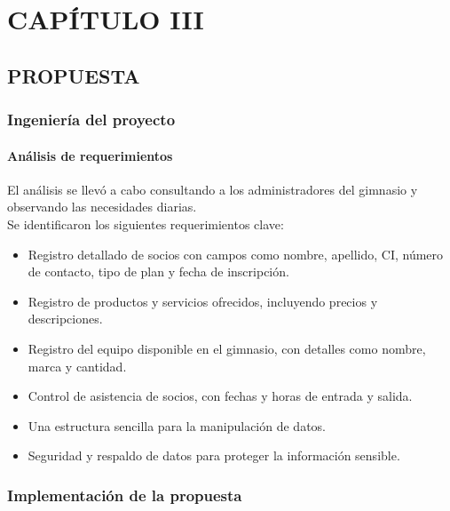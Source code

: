 \documentclass[12pt, letterpaper]{article}
\begin{document}
\section*{CAPÍTULO III}
\setcounter{section}{3}
\subsection{PROPUESTA}
\subsubsection{Ingeniería del proyecto}
\paragraph{Análisis de requerimientos}
El análisis se llevó a cabo consultando a los administradores del gimnasio y observando las necesidades diarias.\\
Se identificaron los siguientes requerimientos clave:\\
\begin{itemize}
    \item Registro detallado de socios con campos como nombre, apellido, CI, número de contacto, tipo de plan y fecha de inscripción.
    \item Registro de productos y servicios ofrecidos, incluyendo precios y descripciones.
    \item Registro del equipo disponible en el gimnasio, con detalles como nombre, marca y cantidad.
    \item Control de asistencia de socios, con fechas y horas de entrada y salida.
    \item Una estructura sencilla para la manipulación de datos.
    \item Seguridad y respaldo de datos para proteger la información sensible.
\end{itemize}
\newpage

\subsubsection{Implementación de la propuesta}
\end{document}
